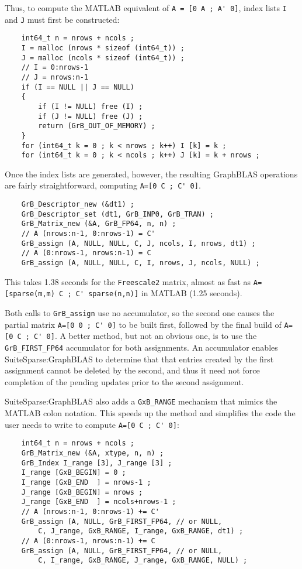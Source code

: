 \documentclass[12pt]{article}
\begin{document}
Thus, to compute the MATLAB equivalent of \verb"A = [0 A ; A' 0]", index lists
\verb'I' and \verb'J' must first be constructed:

    \vspace{-0.05in}
    {\footnotesize
    \begin{verbatim}
    int64_t n = nrows + ncols ;
    I = malloc (nrows * sizeof (int64_t)) ;
    J = malloc (ncols * sizeof (int64_t)) ;
    // I = 0:nrows-1
    // J = nrows:n-1
    if (I == NULL || J == NULL)
    {
        if (I != NULL) free (I) ;
        if (J != NULL) free (J) ;
        return (GrB_OUT_OF_MEMORY) ;
    }
    for (int64_t k = 0 ; k < nrows ; k++) I [k] = k ;
    for (int64_t k = 0 ; k < ncols ; k++) J [k] = k + nrows ; \end{verbatim}}

Once the index lists are generated, however, the resulting GraphBLAS operations
are fairly straightforward, computing \verb"A=[0 C ; C' 0]".

    \vspace{-0.05in}
    {\footnotesize
    \begin{verbatim}
    GrB_Descriptor_new (&dt1) ;
    GrB_Descriptor_set (dt1, GrB_INP0, GrB_TRAN) ;
    GrB_Matrix_new (&A, GrB_FP64, n, n) ;
    // A (nrows:n-1, 0:nrows-1) = C'
    GrB_assign (A, NULL, NULL, C, J, ncols, I, nrows, dt1) ;
    // A (0:nrows-1, nrows:n-1) = C
    GrB_assign (A, NULL, NULL, C, I, nrows, J, ncols, NULL) ; \end{verbatim}}

This takes 1.38 seconds for the \verb'Freescale2' matrix, almost as fast as
\verb"A=[sparse(m,m) C ; C' sparse(n,n)]" in MATLAB (1.25 seconds).

Both calls to \verb'GrB_assign' use no accumulator, so the second one
causes the partial matrix \verb"A=[0 0 ; C' 0]" to be built first, followed by
the final build of \verb"A=[0 C ; C' 0]".  A better method, but not an obvious
one, is to use the \verb'GrB_FIRST_FP64' accumulator for both assignments.  An
accumulator enables SuiteSparse:GraphBLAS to determine that that entries
created by the first assignment cannot be deleted by the second, and thus it
need not force completion of the pending updates prior to the second
assignment.

SuiteSparse:GraphBLAS also adds a \verb'GxB_RANGE' mechanism that mimics
the MATLAB colon notation.  This speeds up the method and simplifies the
code the user needs to write to compute \verb"A=[0 C ; C' 0]":

    \vspace{-0.05in}
    {\footnotesize
    \begin{verbatim}
    int64_t n = nrows + ncols ;
    GrB_Matrix_new (&A, xtype, n, n) ;
    GrB_Index I_range [3], J_range [3] ;
    I_range [GxB_BEGIN] = 0 ;
    I_range [GxB_END  ] = nrows-1 ;
    J_range [GxB_BEGIN] = nrows ;
    J_range [GxB_END  ] = ncols+nrows-1 ;
    // A (nrows:n-1, 0:nrows-1) += C'
    GrB_assign (A, NULL, GrB_FIRST_FP64, // or NULL,
        C, J_range, GxB_RANGE, I_range, GxB_RANGE, dt1) ;
    // A (0:nrows-1, nrows:n-1) += C
    GrB_assign (A, NULL, GrB_FIRST_FP64, // or NULL,
        C, I_range, GxB_RANGE, J_range, GxB_RANGE, NULL) ; \end{verbatim}}
\end{document}
